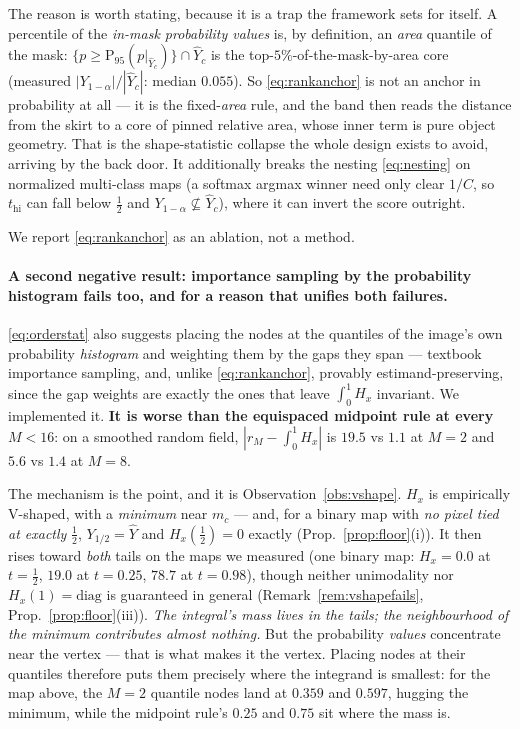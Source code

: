 \documentclass[11pt]{article}
\theoremstyle{remark}
\newcommand{\Yhat}{\widehat{Y}}
\newcommand{\Yhi}{Y_{1-\alpha}}
\newcommand{\diag}{\mathrm{diag}}
\begin{document}
The reason is worth stating, because it is a trap the framework sets for itself. A
percentile of the \emph{in-mask probability values} is, by definition, an \emph{area}
quantile of the mask: $\{p \ge \mathrm{P}_{95}(p|_{\Yhat_c})\} \cap \Yhat_c$ is the
top-$5\%$-of-the-mask-by-area core (measured $|\Yhi|/|\Yhat_c|$: median $0.055$). So
\eqref{eq:rankanchor} is not an anchor in probability at all --- it is the
fixed-\emph{area} rule, and the band then reads the distance from the skirt to a
core of pinned relative area, whose inner term is pure object geometry. That is the
shape-statistic collapse the whole design exists to avoid, arriving by the back door.
It additionally breaks the nesting \eqref{eq:nesting} on normalized multi-class maps
(a softmax argmax winner need only clear $1/C$, so $t_{\mathrm{hi}}$ can fall below
$\tfrac12$ and $\Yhi\not\subseteq\Yhat_c$), where it can invert the score outright.

We report \eqref{eq:rankanchor} as an ablation, not a method.

\paragraph{A second negative result: importance sampling by the probability histogram
fails too, and for a reason that unifies both failures.} \eqref{eq:orderstat} also
suggests placing the nodes at the quantiles of the image's own probability
\emph{histogram} and weighting them by the gaps they span --- textbook importance
sampling, and, unlike \eqref{eq:rankanchor}, provably estimand-preserving, since the
gap weights are exactly the ones that leave $\int_0^1 H_x$ invariant. We implemented
it. \textbf{It is worse than the equispaced midpoint rule at every $M<16$}: on a
smoothed random field, $|r_M - \int_0^1 H_x|$ is $19.5$ vs $1.1$ at $M=2$ and $5.6$ vs
$1.4$ at $M=8$.

The mechanism is the point, and it is Observation~\ref{obs:vshape}. $H_x$ is
empirically V-shaped, with a \emph{minimum} near $m_c$ --- and, for a binary map with
\emph{no pixel tied at exactly} $\tfrac12$, $Y_{1/2} = \Yhat$ and $H_x(\tfrac12)=0$
exactly (Prop.~\ref{prop:floor}(i)). It then rises toward \emph{both} tails on the maps
we measured (one binary map: $H_x = 0.0$ at $t=\tfrac12$, $19.0$ at $t=0.25$, $78.7$ at
$t=0.98$), though neither unimodality nor $H_x(1)=\diag$ is guaranteed in general
(Remark~\ref{rem:vshapefails}, Prop.~\ref{prop:floor}(iii)). \emph{The integral's mass
lives in the tails; the neighbourhood of the minimum contributes almost nothing.} But the
probability \emph{values} concentrate near the vertex --- that is what makes it the
vertex. Placing nodes at their quantiles therefore puts them precisely where the
integrand is smallest: for the map above, the $M=2$ quantile nodes land at $0.359$ and
$0.597$, hugging the minimum, while the midpoint rule's $0.25$ and $0.75$ sit where the
mass is.
\end{document}

